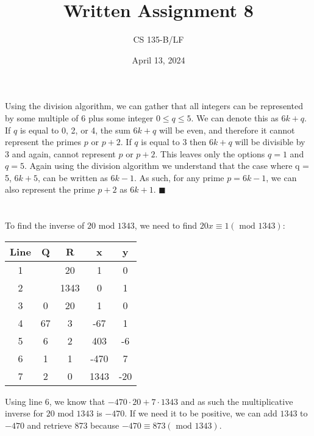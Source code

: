 \documentclass{article}
\title{Written Assignment 8}
\author{CS 135-B/LF}
\date{April 13, 2024}
\renewcommand{\mod}{\text{ mod }}
\begin{document}
\maketitle
\raggedright

\section{}
Using the division algorithm, we can gather that all integers can be represented by some multiple of 6 plus some integer $0 \leq q \leq 5$. We can denote this as $6k + q$. If $q$ is equal to 0, 2, or 4, the sum $6k + q$ will be even, and therefore it cannot represent the primes $p$ or $p+2$. If $q$ is equal to 3 then $6k + q$ will be divisible by 3 and again, cannot represent $p$ or $p+2$. This leaves only the options $q = 1$ and $q = 5$. Again using the division algorithm we understand that the case where q = 5, $6k + 5$, can be written as $6k - 1$. As such, for any prime $p = 6k-1$, we can also represent the prime $p+2$ as $6k+1$. $\blacksquare$


\section{}
\subsection{}
To find the inverse of $20 \mod 1343$, we need to find $20x \equiv 1 (\mod 1343)$:
\begin{table}[hbt!]
    \begin{tabular}{c|cccc}
    Line & Q  & R    & x    & y   \\ \hline
    1    &    & 20   & 1    & 0   \\
    2    &    & 1343 & 0    & 1   \\
    3    & 0  & 20   & 1    & 0   \\
    4    & 67 & 3    & -67  & 1   \\
    5    & 6  & 2    & 403  & -6  \\
    6    & 1  & 1    & -470 & 7   \\
    7    & 2  & 0    & 1343 & -20
    \end{tabular}
\end{table}

Using line 6, we know that $-470 \cdot 20 + 7 \cdot 1343 $ and as such the multiplicative inverse for $20 \mod 1343$ is $-470$. If we need it to be positive, we can add $1343$ to $-470$ and retrieve 873 because $-470 \equiv 873 (\mod 1343)$.
\end{document}
